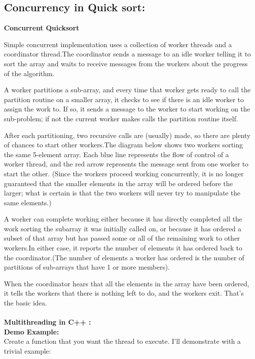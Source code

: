 \documentclass{article}
\begin{document}
	\subsection{Concurrency in Quick sort:}
	\textbf{Concurrent Quicksort} \\
	\par	Simple concurrent implementation uses a collection of worker threads and a coordinator thread.The coordinator sends a message to an idle worker telling it to sort the array and waits to receive messages from the workers about the progress of the algorithm. \par
	A worker partitions a sub-array, and every time that worker gets ready to call the partition routine on a smaller array, it checks to see if there is an idle worker to assign the work to. If so, it sends a message to the worker to start working on the sub-problem; if not the current worker makes calls the partition routine itself.
	\par	After each partitioning, two recursive calls are (usually) made, so there are plenty of chances to start other workers.The diagram below shows two workers sorting the same 5-element array. Each blue line represents the flow of control of a worker thread, and the red arrow represents the message sent from one worker to start the other. (Since the workers proceed working concurrently, it is no longer guaranteed that the smaller elements in the array will be ordered before the larger; what is certain is that the two workers will never try to manipulate the same elements.)
	\par	A worker can complete working either because it has directly completed all the work sorting the subarray it was initially called on, or because it has ordered a subset of that array but has passed some or all of the remaining work to other workers.In either case, it reports the number of elements it has ordered back to the coordinator.(The number of elements a worker has ordered is the number of partitions of sub-arrays that have 1 or more members).
	\par	When the coordinator hears that all the elements in the array have been ordered, it tells the workers that there is nothing left to do, and the workers exit. That’s the basic idea.\\\\
	\textbf{Multithreading in C++ :}\\
	\textbf{Demo Example:} \\
	Create a function that you want the thread to execute. I'll demonstrate with a trivial example:\\
\end{document}
